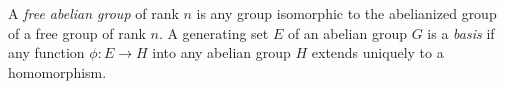 A \textit{free abelian group} of rank $n$ is any group isomorphic to the abelianized group of a free group of rank $n$. A generating set $E$ of an abelian group $G$ is a \textit{basis} if any function $\phi: E \to H$ into any abelian group $H$ extends uniquely to a homomorphism.
